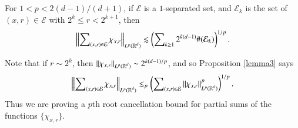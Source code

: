 \begin{prop} \label{lemma3}
    For $1 < p < 2(d-1)/(d+1)$, if $\mathcal{E}$ is a $1$-separated set, and $\mathcal{E}_k$ is the set of $(x,r) \in \mathcal{E}$ with $2^k \leq r < 2^{k+1}$, then
    \[ \left\| \sum\nolimits_{(x,r) \in \mathcal{E}} \chi_{x,r} \right\|_{L^p(\operatorname{\mathbb{R}}^d)} \lesssim \left( \sum\nolimits_{k \geq 1} 2^{k(d-1)} \#(\mathcal{E}_k) \right)^{1/p}. \]
\end{prop}

\begin{remark}
    Note that if $r \sim 2^k$, then $\| \chi_{x,r} \|_{L^p(\operatorname{\mathbb{R}}^d)} \sim 2^{k(d-1)/p}$, and so Proposition \ref{lemma3} says
    \begin{equation}
      \left\| \sum\nolimits_{(x,r) \in \mathcal{E}} \chi_{x,r} \right\|_{L^p(\operatorname{\mathbb{R}}^d)} \lesssim_p \left( \sum\nolimits_{(x,r) \in \mathcal{E}} \| \chi_{x,r} \|_{L^p(\operatorname{\mathbb{R}}^d)}^p \right)^{1/p}.
    \end{equation}
    Thus we are proving a $p$th root cancellation bound for partial sums of the functions $\{ \chi_{x,r} \}$.
\end{remark}

\begin{comment}
\begin{proof}[Proof of Lemma \ref{lemma2} from Lemma \ref{lemma3}]
    Let
    \[ F = \sum\nolimits_{(x,r) \in \mathcal{E}} \chi_{x,r} \]
    and then for $k \geq 1$, let
    \[ F_k = \sum\nolimits_{(x,r) \in \mathcal{E}_k} \chi_{x,r}. \]
    Then $F = \sum\nolimits_k F_k$, and. Applying a dyadic interpolation result (Lemma 2.2 of that paper), the bound
    \[ \| F_k \|_{L^r(\RR^d)} \lesssim 2^k (2^{k(d-r-1)} \#(\mathcal{E}_k)^{1/r}) \]
    which holds for $r$ to the left and right of $p$, can be interpolated to yield that
    \[ \| F \|_{L^p(\RR^d)} \lesssim \left( \sum\nolimits_k 2^{kp} ( 2^{k(d-r-1)} ) \right)^{1/p} \]


    Applying a dyadic interpolation result (Lemma 2.2 of the paper), Lemma \ref{lemma3} implies that
    \[ \left\| \sum\nolimits_{(x,r) \in \mathcal{E}} \chi_{x,r} \right\| \]

    \[ \left\| \sum\nolimits_{(x,r) \in \mathcal{E}} \chi_{x,r} \right\|_{L^p(\RR^d)} \lesssim \left( \sum 2^{kp} 2^{k(d-p-1)} \#(\mathcal{E}_k) \right)^{1/p} = \left( \sum 2^{k(d-1)} \#(\mathcal{E}_k) \right)^{1/p} \]
    This is a restricted strong type bound for Lemma \ref{lemma2}, which we can then interpolate.
\end{proof}
\end{comment}

